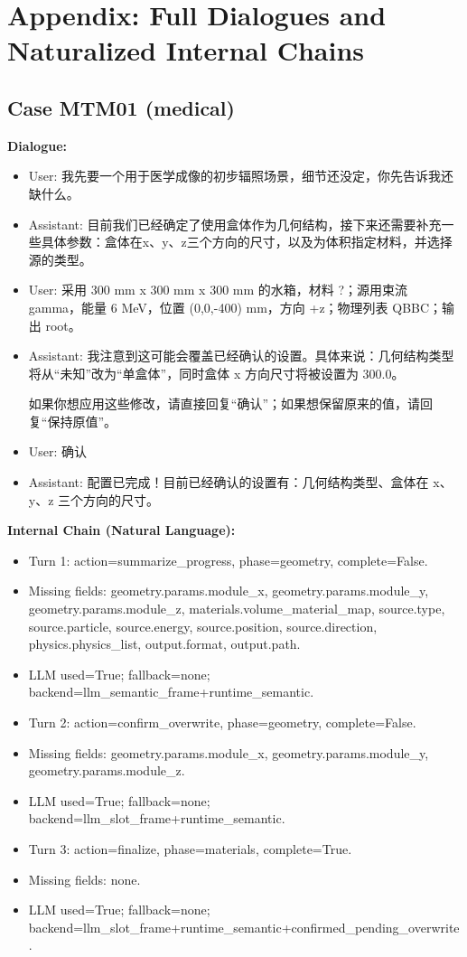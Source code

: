 \documentclass[11pt]{ctexart}
\begin{document}
\section{Appendix: Full Dialogues and Naturalized Internal Chains}
\subsection{Case MTM01 (medical)}
\textbf{Dialogue:}
\begin{itemize}
\item User: 我先要一个用于医学成像的初步辐照场景，细节还没定，你先告诉我还缺什么。
\item Assistant: 目前我们已经确定了使用盒体作为几何结构，接下来还需要补充一些具体参数：盒体在x、y、z三个方向的尺寸，以及为体积指定材料，并选择源的类型。
\item User: 采用 300 mm x 300 mm x 300 mm 的水箱，材料 ?；源用束流 gamma，能量 6 MeV，位置 (0,0,-400) mm，方向 +z；物理列表 QBBC；输出 root。
\item Assistant: 我注意到这可能会覆盖已经确认的设置。具体来说：几何结构类型将从“未知”改为“单盒体”，同时盒体 x 方向尺寸将被设置为 300.0。

如果你想应用这些修改，请直接回复“确认”；如果想保留原来的值，请回复“保持原值”。
\item User: 确认
\item Assistant: 配置已完成！目前已经确认的设置有：几何结构类型、盒体在 x、y、z 三个方向的尺寸。
\end{itemize}
\textbf{Internal Chain (Natural Language):}
\begin{itemize}
\item Turn 1: action=summarize\_progress, phase=geometry, complete=False.
\item Missing fields: geometry.params.module\_x, geometry.params.module\_y, geometry.params.module\_z, materials.volume\_material\_map, source.type, source.particle, source.energy, source.position, source.direction, physics.physics\_list, output.format, output.path.
\item LLM used=True; fallback=none; backend=llm\_semantic\_frame+runtime\_semantic.
\item Turn 2: action=confirm\_overwrite, phase=geometry, complete=False.
\item Missing fields: geometry.params.module\_x, geometry.params.module\_y, geometry.params.module\_z.
\item LLM used=True; fallback=none; backend=llm\_slot\_frame+runtime\_semantic.
\item Turn 3: action=finalize, phase=materials, complete=True.
\item Missing fields: none.
\item LLM used=True; fallback=none; backend=llm\_slot\_frame+runtime\_semantic+confirmed\_pending\_overwrite.
\end{itemize}
\end{document}
